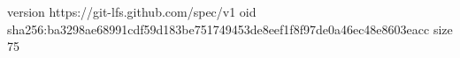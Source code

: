 version https://git-lfs.github.com/spec/v1
oid sha256:ba3298ae68991cdf59d183be751749453de8eef1f8f97de0a46ec48e8603eacc
size 75
